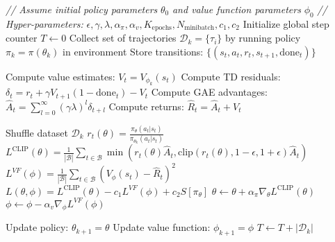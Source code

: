 \begin{algorithmic}
\State \textit{// Assume initial policy parameters } $\theta_0$ \textit{ and value function parameters } $\phi_0$
\State \textit{// Hyper-parameters: } $\epsilon, \gamma, \lambda, \alpha_\pi, \alpha_v, K_{\text{epochs}}, N_{\text{minibatch}}, c_1, c_2$
\State Initialize global step counter $T \gets 0$
    \State Collect set of trajectories $\mathcal{D}_k = \{\tau_i\}$ by running policy $\pi_k = \pi(\theta_k)$ in environment
    \State Store transitions: $\{(s_t, a_t, r_t, s_{t+1}, \text{done}_t)\}$
    
        \State Compute value estimates: $V_t = V_{\phi_k}(s_t)$
        \State Compute TD residuals: $\delta_t = r_t + \gamma V_{t+1} (1 - \text{done}_t) - V_t$
        \State Compute GAE advantages: $\hat{A}_t = \sum_{l=0}^{\infty} (\gamma \lambda)^l \delta_{t+l}$
        \State Compute returns: $\hat{R}_t = \hat{A}_t + V_t$
    \EndFor
    
        \State Shuffle dataset $\mathcal{D}_k$
            \State $r_t(\theta) = \frac{\pi_\theta(a_t | s_t)}{\pi_{\theta_k}(a_t | s_t)}$
            \State $L^{\text{CLIP}}(\theta) = \frac{1}{|\mathcal{B}|} \sum_{t \in \mathcal{B}} \min\left(r_t(\theta) \hat{A}_t, \text{clip}(r_t(\theta), 1-\epsilon, 1+\epsilon) \hat{A}_t\right)$
            \State $L^{VF}(\phi) = \frac{1}{|\mathcal{B}|} \sum_{t \in \mathcal{B}} \left(V_\phi(s_t) - \hat{R}_t\right)^2$
            \State $L(\theta, \phi) = L^{\text{CLIP}}(\theta) - c_1 L^{VF}(\phi) + c_2 S[\pi_\theta]$
            \State $\theta \gets \theta + \alpha_\pi \nabla_\theta L^{\text{CLIP}}(\theta)$
            \State $\phi \gets \phi - \alpha_v \nabla_\phi L^{VF}(\phi)$
        \EndFor
    \EndFor
    
    \State Update policy: $\theta_{k+1} = \theta$
    \State Update value function: $\phi_{k+1} = \phi$
    \State $T \gets T + |\mathcal{D}_k|$
\EndFor
\end{algorithmic}
